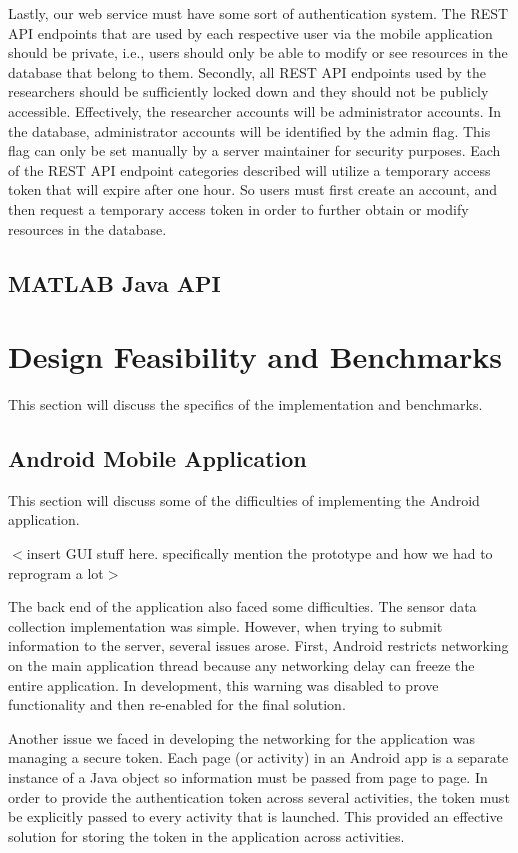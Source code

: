 \documentclass[conference]{IEEEtran}
\begin{document}
Lastly, our web service must have some sort of authentication system. The REST API endpoints that are used by each respective user via the mobile application should be private, i.e., users should only be able to modify or see resources in the database that belong to them. Secondly, all REST API endpoints used by the researchers should be sufficiently locked down and they should not be publicly accessible. Effectively, the researcher accounts will be administrator accounts. In the database, administrator accounts will be identified by the admin flag. This flag can only be set manually by a server maintainer for security purposes. Each of the REST API endpoint categories described will utilize a temporary access token that will expire after one hour. So users must first create an account, and then request a temporary access token in order to further obtain or modify resources in the database.

\subsection{MATLAB Java API}


\section{Design Feasibility and Benchmarks}

This section will discuss the specifics of the implementation and benchmarks.

\subsection{Android Mobile Application}
This section will discuss some of the difficulties of implementing the Android application. 

$<$insert GUI stuff here. specifically mention the prototype and how we had to reprogram a lot$>$

The back end of the application also faced some difficulties. The sensor data collection implementation was simple. However, when trying to submit information to the server, several issues arose. First, Android restricts networking on the main application thread because any networking delay can freeze the entire application. In development, this warning was disabled to prove functionality and then re-enabled for the final solution. 

Another issue we faced in developing the networking for the application was managing a secure token. Each page (or activity) in an Android app is a separate instance of a Java object so information must be passed from page to page. In order to provide the authentication token across several activities, the token must be explicitly passed to every activity that is launched. This provided an effective solution for storing the token in the application across activities. 
\end{document}
